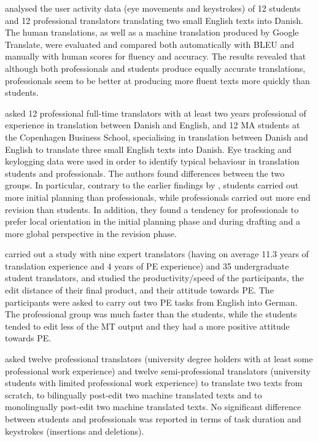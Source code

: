 \documentclass[output=paper]{langscibook}
\begin{document}
\citet{CarlBuch-Kromann2010} analysed the user activity data (eye movements and keystrokes) of 12 students and 12 professional translators translating two small English texts into Danish. The human translations, as well as a machine translation produced by Google Translate, were evaluated and compared both automatically with BLEU and manually with human scores for fluency and accuracy. The results revealed that although both professionals and students produce equally accurate translations, professionals seem to be better at producing more fluent texts more quickly than students. 

\citet{dragsted2013towards} asked 12 professional full-time translators with at least two years professional of experience in translation between Danish and English, and 12 MA students at the Copenhagen Business School, specialising in translation between Danish and English to translate three small English texts into Danish. Eye tracking and keylogging data were used in order to identify typical behaviour in translation students and professionals. The authors found differences between the two groups. In particular, contrary to the earlier findings by \citet{Jakobsen2002}, students carried out more initial planning than professionals, while professionals carried out more end revision than students. In addition, they found a tendency for professionals to prefer local orientation in the initial planning phase and during drafting and a more global perspective in the revision phase. 

\citet{moorkens-obrien-2015-post} carried out a study with nine expert translators (having on average 11.3 years of translation experience and 4 years of PE experience) and 35 undergraduate student translators, and studied the productivity/speed of the participants, the edit distance of their final product, and their attitude towards PE. The participants were asked to carry out two PE tasks from English into German. The professional group was much faster than the students, while the students tended to edit less of the MT output and they had a more positive attitude towards PE.

\citet{nitzke2019problem} asked twelve professional translators (university degree holders with at least some professional work experience) and twelve semi-professional translators (university students with limited professional work experience) to translate two texts from scratch, to bilingually post-edit two machine translated texts and to monolingually post-edit two machine translated texts. No significant difference between students and professionals was reported in terms of task duration and keystrokes (insertions and deletions).
\end{document}
